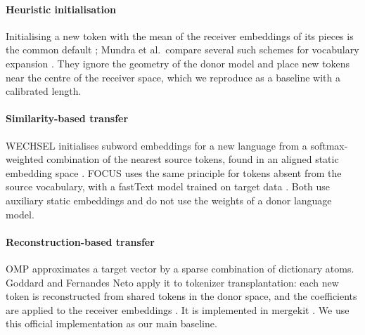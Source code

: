 \documentclass[preprint,12pt]{elsarticle}
\begin{document}
\paragraph{Heuristic initialisation} Initialising a new token with the mean of the receiver embeddings of its pieces is the common default \cite{gee2022fvt,hewitt2021initializing}; Mundra et al.\ compare several such schemes for vocabulary expansion \cite{mundra2024empirical}. They ignore the geometry of the donor model and place new tokens near the centre of the receiver space, which we reproduce as a baseline with a calibrated length.

\paragraph{Similarity-based transfer} WECHSEL initialises subword embeddings for a new language from a softmax-weighted combination of the nearest source tokens, found in an aligned static embedding space \cite{minixhofer2022wechsel}. FOCUS uses the same principle for tokens absent from the source vocabulary, with a fastText model trained on target data \cite{dobler2023focus,bojanowski2017fasttext}. Both use auxiliary static embeddings and do not use the weights of a donor language model.

\paragraph{Reconstruction-based transfer} OMP \cite{pati1993omp,tropp2007signal} approximates a target vector by a sparse combination of dictionary atoms. Goddard and Fernandes Neto apply it to tokenizer transplantation: each new token is reconstructed from shared tokens in the donor space, and the coefficients are applied to the receiver embeddings \cite{goddard2025omp}. It is implemented in mergekit \cite{goddard2024mergekit}. We use this official implementation as our main baseline.
\end{document}
